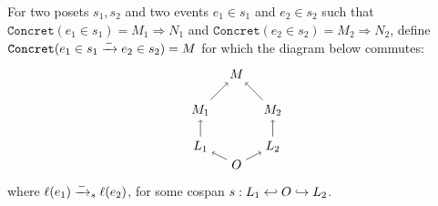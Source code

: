 \begin{definition}
\label{def:ref_neg_infl}
  For two posets $s_1,s_2$ and two events $e_1\in s_1$ and $e_2\in s_2$ such that  $\mathtt{Concret}(e_1\in s_1) = M_1\Rightarrow N_1$ and $\mathtt{Concret}(e_2\in s_2) = M_2\Rightarrow N_2$, define $\mathtt{Concret}(e_1\in s_1\mathrel{\xrightarrow{-}} e_2\in s_2) = M$ for which the diagram below commutes:
  \[
  \begin{tikzpicture} %
    \node (o) at (0,-0.5) {\(O\)};
    \node (n) at (0,2) {\(M\)};
    \node (l1) at (-1,0) {\(L_1\)};
    \node (l2) at (1,0) {\(L_2\)};
    \node (n1) at (-1,1) {\(M_1\)};
    \node (n2) at (1,1) {\(M_2\)};
    \draw [->] (l1) -- (n1);
    \draw [->] (l2) -- (n2);
    \draw [->] (o) -- (l1);
    \draw [->] (o) -- (l2);
    \draw [->] (n1) -- (n);
    \draw [->] (n2) -- (n);
  \end{tikzpicture}
  \]
  where $\ell(e_1)\mathrel{\xrightarrow{-}}_s\ell(e_2)$, for some cospan $s:L_1\hookleftarrow O\hookrightarrow L_2$.
\end{definition}
